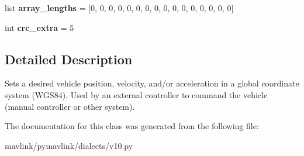 \begin{DoxyCompactItemize}
list {\bfseries array\+\_\+lengths} = \mbox{[}0, 0, 0, 0, 0, 0, 0, 0, 0, 0, 0, 0, 0, 0, 0, 0\mbox{]}
\item 
\mbox{\label{classpymavlink_1_1dialects_1_1v10_1_1MAVLink__set__position__target__global__int__message_a5c361374aed05a4dcb48af79e6aa338f}} 
int {\bfseries crc\+\_\+extra} = 5
\end{DoxyCompactItemize}


\subsection{Detailed Description}
\begin{DoxyVerb}Sets a desired vehicle position, velocity, and/or acceleration
in a global coordinate system (WGS84). Used by an external
controller to command the vehicle (manual controller or other
system).
\end{DoxyVerb}
 

The documentation for this class was generated from the following file\+:\begin{DoxyCompactItemize}
\item 
mavlink/pymavlink/dialects/v10.\+py\end{DoxyCompactItemize}
